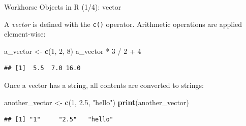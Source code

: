 \documentclass[10pt,ignorenonframetext,]{beamer}
\newenvironment{Shaded}{\begin{snugshade}}{\end{snugshade}}
\newcommand{\KeywordTok}[1]{\textcolor[rgb]{0.13,0.29,0.53}{\textbf{{#1}}}}
\newcommand{\DecValTok}[1]{\textcolor[rgb]{0.00,0.00,0.81}{{#1}}}
\newcommand{\FloatTok}[1]{\textcolor[rgb]{0.00,0.00,0.81}{{#1}}}
\newcommand{\StringTok}[1]{\textcolor[rgb]{0.31,0.60,0.02}{{#1}}}
\newcommand{\NormalTok}[1]{{#1}}
\begin{document}
\begin{frame}[fragile]{Workhorse Objects in R (1/4): vector}

A \emph{vector} is defined with the \texttt{c()} operator. Arithmetic
operations are applied element-wise:

\footnotesize

\begin{Shaded}
\begin{Highlighting}[]
\NormalTok{a_vector <-}\StringTok{ }\KeywordTok{c}\NormalTok{(}\DecValTok{1}\NormalTok{, }\DecValTok{2}\NormalTok{, }\DecValTok{8}\NormalTok{)}
\NormalTok{a_vector *}\StringTok{ }\DecValTok{3} \NormalTok{/}\StringTok{ }\DecValTok{2} \NormalTok{+}\StringTok{ }\DecValTok{4}
\end{Highlighting}
\end{Shaded}

\begin{verbatim}
## [1]  5.5  7.0 16.0
\end{verbatim}

\normalsize

Once a vector has a string, all contents are converted to strings:

\footnotesize

\begin{Shaded}
\begin{Highlighting}[]
\NormalTok{another_vector <-}\StringTok{ }\KeywordTok{c}\NormalTok{(}\DecValTok{1}\NormalTok{, }\FloatTok{2.5}\NormalTok{, }\StringTok{"hello"}\NormalTok{)}
\KeywordTok{print}\NormalTok{(another_vector)}
\end{Highlighting}
\end{Shaded}

\begin{verbatim}
## [1] "1"     "2.5"   "hello"
\end{verbatim}

\normalsize

\end{frame}
\end{document}
